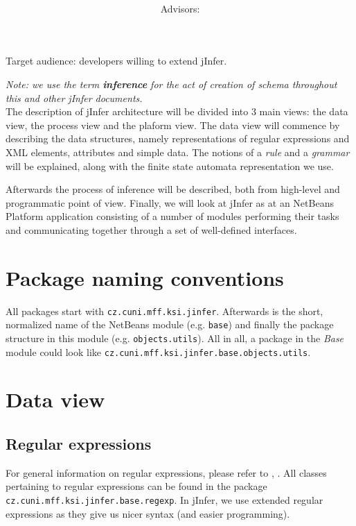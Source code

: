 \documentclass[a4paper,10pt,oneside]{article}
\title{\bf\mftitle}
\author{\mfauthor \\ Advisors: \mfadvisor}
\date{\mfplacedate}
\newcommand{\code}[1]{\texttt{#1}}
\newcommand{\jmodule}[1]{\emph{#1}}
\begin{document}
\maketitle
\noindent Target audience: developers willing to extend jInfer.

\noindent \emph{Note: we use the term \textbf{inference} for the act of creation of schema throughout this and other jInfer documents.}\\

The description of jInfer architecture will be divided into 3 main views: the data view, the process view and the plaform view.
The data view will commence by describing the data structures, namely representations of regular expressions and XML elements, attributes and simple data. The notions of a \emph{rule} and a \emph{grammar} will be explained, along with the finite state automata representation we use.

Afterwards the process of inference will be described, both from high-level and programmatic point of view.
Finally, we will look at jInfer as at an NetBeans Platform application consisting of a number of modules performing their tasks and communicating together through a set of well-defined interfaces.

\section{Package naming conventions}
All packages start with \code{cz.cuni.mff.ksi.jinfer}. Afterwards is the short, normalized name of the NetBeans module (e.g. \code{base}) and finally the package structure in this module (e.g. \texttt{objects.utils}). All in all, a package in the \jmodule{Base} module could look like \code{cz.cuni.mff.ksi.jinfer.base.objects.utils}.

\section{Data view}
\subsection{Regular expressions}
For general information on regular expressions, please refer to \cite{wikiregexp}, \cite{automatatheory}.
All classes pertaining to regular expressions can be found in the package \code{cz.cuni.mff.ksi.jinfer.base.regexp}.
In jInfer, we use extended regular expressions as they give us nicer syntax (and easier programming).
\end{document}
